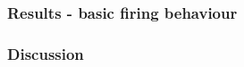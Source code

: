 \documentclass{beamer}
\begin{document}
\begin{frame}
    \frametitle{Results - basic firing behaviour} 
\end{frame}

\begin{frame}
    \frametitle{Discussion}
\end{frame}
\end{document}
